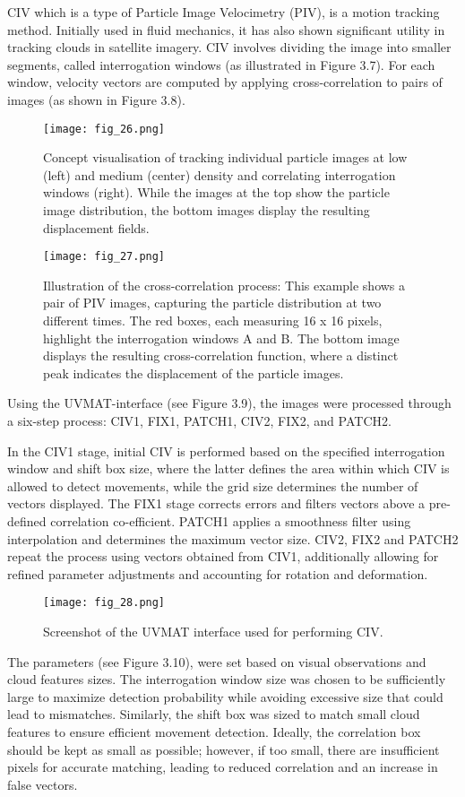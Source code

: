 CIV which is a type of Particle Image Velocimetry (PIV), is a motion tracking method. Initially used in fluid mechanics, it has also shown significant utility in tracking clouds in satellite imagery. CIV involves dividing the image into smaller segments, called interrogation windows (as illustrated in Figure 3.7). For each window, velocity vectors are computed by applying cross-correlation to pairs of images\cite{Scharnowski2020} (as shown in Figure 3.8).
\FloatBarrier
\begin{figure}[h!] 
    \centering
    \texttt{[image: fig\_26.png]}
    \caption{Concept visualisation of tracking individual particle images at low (left) and medium (center) density and correlating interrogation windows (right)\cite{Scharnowski2020}. While the images at the top show the particle image distribution, the bottom images display the resulting displacement fields.}
\end{figure}
\FloatBarrier
\begin{figure}[h!] 
    \centering
    \texttt{[image: fig\_27.png]}
    \caption{Illustration of the cross-correlation process: This example shows a pair of PIV images, capturing the particle distribution at two different times\cite{Scharnowski2020}. The red boxes, each measuring 16 x 16 pixels, highlight the interrogation windows A and B. The bottom image displays the resulting cross-correlation function, where a distinct peak indicates the displacement of the particle images.}
\end{figure}
\FloatBarrier
Using the UVMAT-interface (see Figure 3.9), the images were processed through a six-step process: CIV1, FIX1, PATCH1, CIV2, FIX2, and PATCH2\cite{SoftUVMAT}. 

In the CIV1 stage, initial CIV is performed based on the specified interrogation window and shift box size, where the latter defines the area within which CIV is allowed to detect movements, while the grid size determines the number of vectors displayed. The FIX1 stage corrects errors and filters vectors above a pre-defined correlation co-efficient. PATCH1 applies a smoothness filter using interpolation and determines the maximum vector size. 
CIV2, FIX2 and PATCH2 repeat the process using vectors obtained from CIV1, additionally allowing for refined parameter adjustments and accounting for rotation and deformation.
\FloatBarrier
\begin{figure}[h!] 
    \centering
    \texttt{[image: fig\_28.png]}
    \caption{Screenshot of the UVMAT interface used for performing CIV\cite{SoftUVMAT}.}
\end{figure}
\FloatBarrier
The parameters (see Figure 3.10), were set based on visual observations and cloud features sizes. 
The interrogation window size was chosen to be sufficiently large to maximize detection probability while avoiding excessive size that could lead to mismatches. Similarly, the shift box was sized to match small cloud features to ensure efficient movement detection. Ideally, the correlation box should be kept as small as possible; however, if too small, there are insufficient pixels for accurate matching, leading to reduced correlation and an increase in false vectors.

